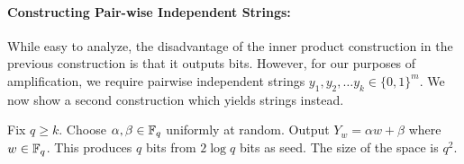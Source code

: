 \paragraph{Constructing Pair-wise Independent Strings:}
While easy to analyze, the disadvantage of the inner product construction in the previous construction is that it outputs bits. However, for our purposes of amplification, we require pairwise independent strings $y_1, y_2, \ldots y_k \in \{0,1\}^m$. We now show a second construction which yields strings instead.

\begin{definition}
Fix $q \ge k$. Choose $\alpha, \beta \in {\mathbb{F}}_q$ uniformly at random. Output $Y_w = \alpha w+\beta$ where $w \in {\mathbb{F}}_q$. This produces $q$ bits from $2\log q$ bits as seed. The size of the space is $q^2$.
\end{definition}

